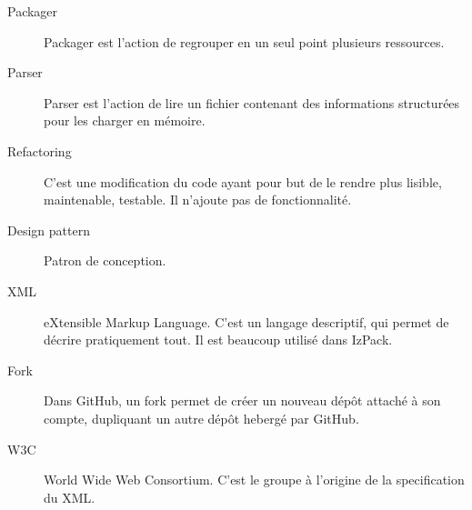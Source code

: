 \begin{description}
	\item[Packager] Packager est l'action de regrouper en un seul point plusieurs ressources.
	\item[Parser] Parser est l'action de lire un fichier contenant des informations structurées pour les charger en mémoire.
	\item[Refactoring] C'est une modification du code ayant pour but de le rendre plus lisible, maintenable, testable. Il n'ajoute pas de fonctionnalité.
	\item[Design pattern] Patron de conception.
	\item[XML] eXtensible Markup Language. C'est un langage descriptif, qui permet de décrire pratiquement tout. Il est beaucoup utilisé dans IzPack.
	\item[Fork] Dans GitHub, un fork permet de créer un nouveau dépôt attaché à son compte, dupliquant un autre dépôt hebergé par GitHub.
	\item[W3C] World Wide Web Consortium. C'est le groupe à l'origine de la specification du XML.
\end{description}
